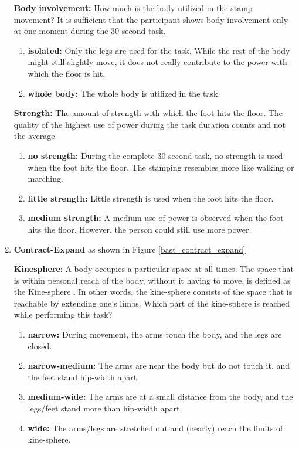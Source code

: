 \documentclass[extern,palatino]{cgMA}
\begin{document}
\begin{enumerate}[I]
    \textbf{Body involvement:} How much is the body utilized in the stamp movement? It is sufficient that the participant shows body involvement only at one moment during the 30-second task.
    \begin{enumerate}
        \item \textbf{isolated:} Only the legs are used for the task. While the rest of the body might still slightly move, it does not really contribute to the power with which the floor is hit.
        \item \textbf{whole body:} The whole body is utilized in the task. 
    \end{enumerate}
    \textbf{Strength:} The amount of strength with which the foot hits the floor. The quality of the highest use of power during the task duration counts and not the average.
    \begin{enumerate}
        \item \textbf{no strength:} During the complete 30-second task, no strength is used when the foot hits the floor. The stamping resembles more like walking or marching.
        \item \textbf{little strength:} Little strength is used when the foot hits the floor.
        \item \textbf{medium strength:} A medium use of power is observed when the foot hits the floor. However, the person could still use more power.
    \end{enumerate}
\item \textbf{Contract-Expand} as shown in Figure \ref{bast_contract_expand}
    
    \textbf{Kinesphere}: A body occupies a particular space at all times. The space that is within personal reach of the body, without it having to move, is defined as the Kine-sphere \cite{block1998keep}. In other words, the kine-sphere consists of the space that is reachable by extending one's limbs.
    Which part of the kine-sphere is reached while performing this task?
    \begin{enumerate}
        \item \textbf{narrow:} During movement, the arms touch the body, and the legs are closed.
        \item \textbf{narrow-medium:} The arms are near the body but do not touch it, and the feet stand hip-width apart. 
        \item \textbf{medium-wide:} The arms are at a small distance from the body, and the legs/feet stand more than hip-width apart. 
        \item \textbf{wide:} The arms/legs are stretched out and (nearly) reach the limits of kine-sphere.
    \end{enumerate}
    

\end{enumerate}
\end{document}
